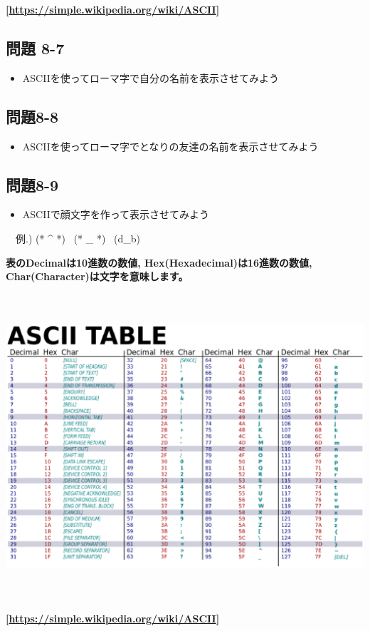 \documentclass[a4paper,12pt,dvipdfmx]{jarticle}
\begin{document}
{\bfseries
[\url{https://simple.wikipedia.org/wiki/ASCII}]}

\clearpage\subsection*{問題 8-7}
\begin{itemize}
\item
ASCIIを使ってローマ字で自分の名前を表示させてみよう
\end{itemize}
\subsection*{問題8-8}
\begin{itemize}
\item
ASCIIを使ってローマ字でとなりの友達の名前を表示させてみよう
\end{itemize}
\subsection*{問題8-9}
\begin{itemize}
\item
ASCIIで顔文字を作って表示させてみよう
\end{itemize}
\ \ 例.) (* \^{} *) \ (* \_ *) \ (d\_b)


\bigskip

{\bfseries
表のDecimalは10進数の数値,
Hex(Hexadecimal)は16進数の数値,
Char(Character)は文字を意味します。}

\begin{center}
\includegraphics[width=17.006cm,height=11.317cm]{textbook-img016.eps}

\end{center}
{\bfseries
[\url{https://simple.wikipedia.org/wiki/ASCII}]}
\end{document}
